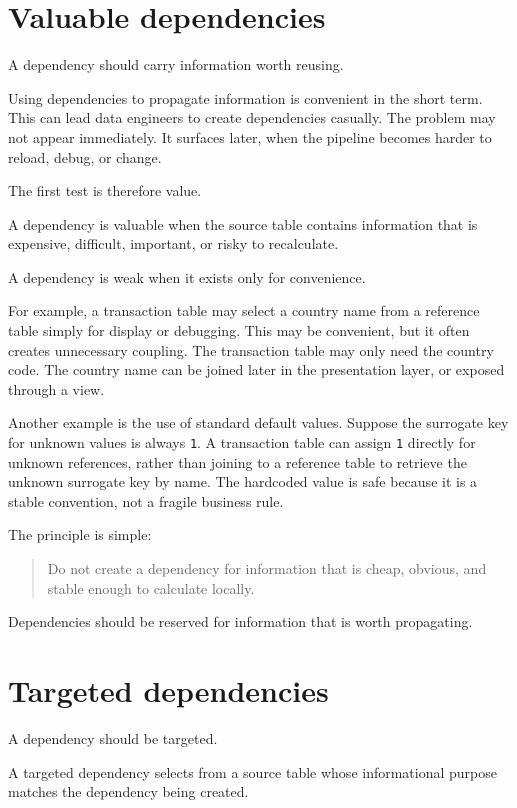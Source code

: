 \documentclass[10pt,openany,10pt]{book}
\begin{document}
\section{Valuable dependencies}\label{valuable-dependencies}

A dependency should carry information worth reusing.

Using dependencies to propagate information is convenient in the short
term. This can lead data engineers to create dependencies casually. The
problem may not appear immediately. It surfaces later, when the pipeline
becomes harder to reload, debug, or change.

The first test is therefore value.

A dependency is valuable when the source table contains information that
is expensive, difficult, important, or risky to recalculate.

A dependency is weak when it exists only for convenience.

For example, a transaction table may select a country name from a
reference table simply for display or debugging. This may be convenient,
but it often creates unnecessary coupling. The transaction table may
only need the country code. The country name can be joined later in the
presentation layer, or exposed through a view.

Another example is the use of standard default values. Suppose the
surrogate key for unknown values is always \texttt{1}. A transaction
table can assign \texttt{1} directly for unknown references, rather than
joining to a reference table to retrieve the unknown surrogate key by
name. The hardcoded value is safe because it is a stable convention, not
a fragile business rule.

The principle is simple:

\begin{quote}
Do not create a dependency for information that is cheap, obvious, and
stable enough to calculate locally.
\end{quote}

Dependencies should be reserved for information that is worth
propagating.

\section{Targeted dependencies}\label{targeted-dependencies}

A dependency should be targeted.

A targeted dependency selects from a source table whose informational
purpose matches the dependency being created.
\end{document}
